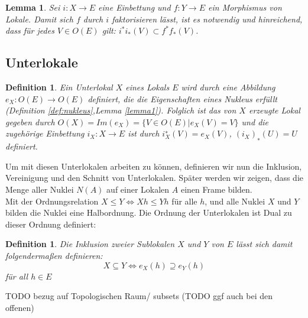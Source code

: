 \documentclass{article}
\newtheorem{lemma}[satz]{Lemma}
\newtheorem{definition}[satz]{Definition}
\begin{document}
\begin{lemma}
    Sei  $i:X\to E$ eine Einbettung und $f:Y\to E$ ein Morphismus von Lokale. Damit sich  $f$ durch $i$ faktorisieren lässt, ist es notwendig und hinreichend, dass für jedes $V\in O(E)$ gilt: $i^* i_* (V)\subset f^* f_* (V)$.
\end{lemma}

\subsection{Unterlokale}
\begin{definition}
    Ein Unterlokal $X$ eines Lokals $E$ wird durch eine Abbildung $e_X:O(E)\to O(E)$ definiert, die die Eigenschaften eines Nukleus erfüllt (Definition \ref{def:nukleus},Lemma \ref{lemma1}). Folglich ist das von $X$ erzeugte Lokal gegeben durch $O(X)=Im(e_X)=\{V\in O(E) | e_X(V)=V\}$ und die zugehörige Einbettung $i_X:X\to E$ ist durch $i^∗_X(V)=e_X(V)$, $(i_X)_∗(U)=U$ definiert. \autocite{noauthor_sublocale_nodate}
\end{definition}


Um mit diesen Unterlokalen arbeiten zu können, definieren wir nun die Inklusion, Vereinigung und den Schnitt von Unterlokalen. Später werden wir zeigen, dass die Menge aller Nuklei $N(A)$ auf einer Lokalen $A$ einen Frame bilden. \\

Mit der Ordnungsrelation $X \le Y \iff X h \le Y h$ für alle $h$, und alle Nuklei $X$ und $Y$ bilden die Nuklei eine Halbordnung. Die Ordnung der Unterlokalen ist Dual zu dieser Ordnung definiert: 

\begin{definition}
    Die Inklusion zweier Sublokalen $X$ und $Y$ von $E$ lässt sich damit folgendermaßen definieren:
    $$X \subseteq Y \iff e_X(h) \supseteq e_Y(h)$$
    für all $h \in E$
\end{definition}

TODO bezug auf Topologischen Raum/ subsets (TODO ggf auch bei den offenen)
\\
\end{document}
